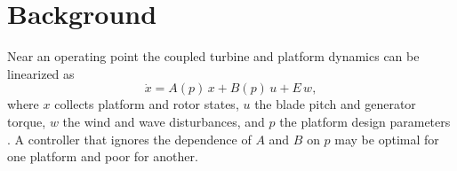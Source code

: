 \chapter{Background}
\label{ch:background}

Near an operating point the coupled turbine and platform dynamics can be linearized as
\begin{equation}
  \dot{x} = A(p)\,x + B(p)\,u + E\,w ,
  \label{eq:linear}
\end{equation}
where $x$ collects platform and rotor states, $u$ the blade pitch and generator torque, $w$ the
wind and wave disturbances, and $p$ the platform design parameters \citep{jonkman2010}. A
controller that ignores the dependence of $A$ and $B$ on $p$ may be optimal for one platform
and poor for another.
